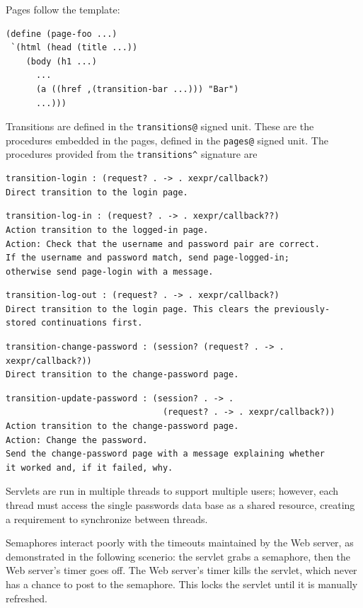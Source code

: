 \documentclass{article}
\begin{document}
Pages follow the template:

\begin{verbatim}
(define (page-foo ...)
 `(html (head (title ...))
    (body (h1 ...)
      ...
      (a ((href ,(transition-bar ...))) "Bar")
      ...)))
\end{verbatim}

Transitions are defined in the \verb|transitions@| signed unit. These are the
procedures embedded in the pages, defined in the \verb|pages@| signed unit. The
procedures provided from the \verb|transitions^| signature are

\begin{verbatim}
transition-login : (request? . -> . xexpr/callback?)
Direct transition to the login page.
\end{verbatim}

\begin{verbatim}
transition-log-in : (request? . -> . xexpr/callback??)
Action transition to the logged-in page.
Action: Check that the username and password pair are correct.
If the username and password match, send page-logged-in;
otherwise send page-login with a message.
\end{verbatim}

\begin{verbatim}
transition-log-out : (request? . -> . xexpr/callback?)
Direct transition to the login page. This clears the previously-
stored continuations first.
\end{verbatim}

\begin{verbatim}
transition-change-password : (session? (request? . -> . xexpr/callback?))
Direct transition to the change-password page.
\end{verbatim}

\begin{verbatim}
transition-update-password : (session? . -> .
                               (request? . -> . xexpr/callback?))
Action transition to the change-password page.
Action: Change the password.
Send the change-password page with a message explaining whether
it worked and, if it failed, why.
\end{verbatim}

Servlets are run in multiple threads to support multiple users; however, each
thread must access the single passwords data base as a shared resource,
creating a requirement to synchronize between threads.

Semaphores interact poorly with the timeouts maintained by the Web server, as
demonstrated in the following scenerio: the servlet grabs a semaphore, then the
Web server's timer goes off. The Web server's timer kills the servlet, which
never has a chance to post to the semaphore. This locks the servlet until it is
manually refreshed.
\end{document}
